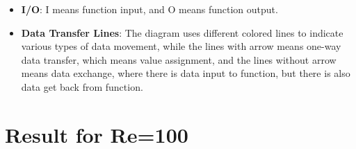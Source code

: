 \documentclass[12pt]{article}
\begin{document}
\begin{itemize}
    \item \textbf{I/O}: I means function input, and O means function output.
    \item \textbf{Data Transfer Lines}: The diagram uses different colored lines to indicate various types of data movement, while the lines with arrow means one-way data transfer, which means value assignment, and the lines without arrow means data exchange, where there is data input to function, but there is also data get back from function.
\end{itemize}

















\newpage
\section{Result for Re=100}
\end{document}
